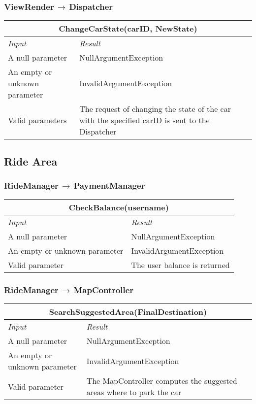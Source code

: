 \documentclass[11pt,a4paper]{report}
\begin{document}
\subsubsection{ViewRender$\,\to\,$Dispatcher}
\begin{tabularx}{\textwidth}{|X|X|}
	\hline
	\multicolumn{2}{|c|}{\textbf{ChangeCarState(carID, NewState)}}\\
	\hline
	\textit{Input} & \textit{Result}\\
	\hline
	A null parameter & NullArgumentException\\
	\hline
	An empty or unknown parameter & InvalidArgumentException\\
	\hline
	Valid parameters & The request of changing the state of the car with the specified carID is sent to the Dispatcher\\
	\hline
\end{tabularx}
\subsection{Ride Area}
\subsubsection{RideManager$\,\to\,$PaymentManager}
\begin{tabularx}{\textwidth}{|X|X|}
	\hline
	\multicolumn{2}{|c|}{\textbf{CheckBalance(username)}}\\
	\hline
	\textit{Input} & \textit{Result}\\
	\hline
	A null parameter & NullArgumentException\\
	\hline
	An empty or unknown parameter & InvalidArgumentException\\
	\hline
	Valid parameter & The user balance is returned\\
	\hline
\end{tabularx}
\subsubsection{RideManager$\,\to\,$MapController}
\begin{tabularx}{\textwidth}{|X|X|}
	\hline
	\multicolumn{2}{|c|}{\textbf{SearchSuggestedArea(FinalDestination)}}\\
	\hline
	\textit{Input} & \textit{Result}\\
	\hline
	A null parameter & NullArgumentException\\
	\hline
	An empty or unknown parameter & InvalidArgumentException\\
	\hline
	Valid parameter & The MapController computes the suggested areas where to park the car\\
	\hline
\end{tabularx}
\end{document}
